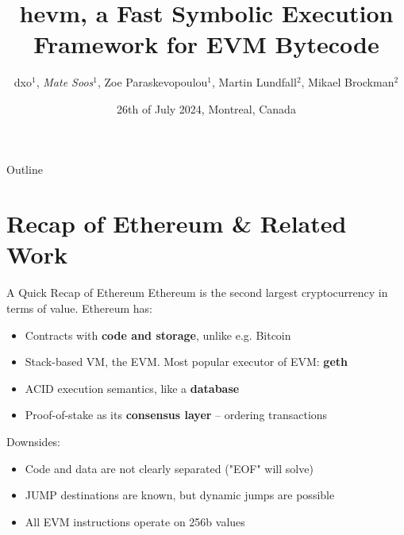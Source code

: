 \documentclass[aspectratio=169]{beamer}
\title[hevm]{hevm, a Fast Symbolic Execution Framework for EVM Bytecode}
\author[dxo, Soos, Paraskevopoulou, Lundfall, Brockmann]{dxo$^{1}$, \emph{Mate Soos$^{1}$}, Zoe Paraskevopoulou$^{1}$, Martin Lundfall$^{2}$, Mikael Brockman$^{2}$}
\institute[]{$^{1}$ Ethereum Foundation, $^{2}$ Independent Researcher}
\date{26th of July 2024, Montreal, Canada}
\begin{document}
\begin{frame}
    \titlepage 
\end{frame}

%

\begin{frame}{Outline}
    \tableofcontents
\end{frame}

\section{Recap of Ethereum \& Related Work}

\begin{frame}{A Quick Recap of Ethereum}
Ethereum is the second largest cryptocurrency in terms of value. Ethereum has:
\begin{itemize}
\item Contracts with \textbf{code and storage}, unlike e.g. Bitcoin
\item Stack-based VM, the EVM. Most popular executor of EVM: \textbf{geth}
\item ACID execution semantics, like a \textbf{database}
\item Proof-of-stake as its \textbf{consensus layer} -- ordering transactions
\end{itemize}

Downsides:
\begin{itemize}
\item Code and data are not clearly separated ("EOF" will solve)
\item JUMP destinations are known, but dynamic jumps are possible
\item All EVM instructions operate on 256b values
\end{itemize}

\end{frame}
\end{document}
